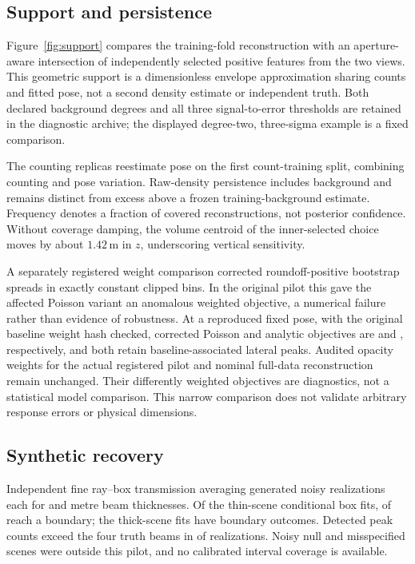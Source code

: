 \subsection{Support and persistence}
Figure~\ref{fig:support} compares the training-fold reconstruction with an aperture-aware intersection of independently selected positive features from the two views. This geometric support is a dimensionless envelope approximation sharing counts and fitted pose, not a second density estimate or independent truth. Both declared background degrees and all three signal-to-error thresholds are retained in the diagnostic archive; the displayed degree-two, three-sigma example is a fixed comparison.

The \InternalCountReplicas{} counting replicas reestimate pose on the first count-training split, combining counting and pose variation. Raw-density persistence includes background and remains distinct from excess above a frozen training-background estimate. Frequency denotes a fraction of covered reconstructions, not posterior confidence. Without coverage damping, the volume centroid of the inner-selected choice moves by about $1.42\,\mathrm{m}$ in $z$, underscoring vertical sensitivity.

A separately registered weight comparison corrected roundoff-positive bootstrap spreads in exactly constant clipped bins. In the original pilot this gave the affected Poisson variant an anomalous weighted objective, a numerical failure rather than evidence of robustness. At a reproduced fixed pose, with the original baseline weight hash checked, corrected Poisson and analytic objectives are \InternalCorrectedPoissonObjective{} and \InternalCorrectedAnalyticObjective{}, respectively, and both retain \InternalCorrectedWeightPeaks{} baseline-associated lateral peaks. Audited opacity weights for the actual registered pilot and nominal full-data reconstruction remain unchanged. Their differently weighted objectives are diagnostics, not a statistical model comparison. This narrow comparison does not validate arbitrary response errors or physical dimensions.

\subsection{Synthetic recovery}
Independent fine ray--box transmission averaging generated \InternalThinReplicas{} noisy realizations each for \InternalThinTruthThickness{} and \InternalThickTruthThickness{} metre beam thicknesses. Of the thin-scene conditional box fits, \InternalThinBoundary{} of \InternalThinReplicas{} reach a boundary; the thick-scene fits have \InternalThickBoundary{} boundary outcomes. Detected peak counts exceed the four truth beams in \InternalExcessPeakOutcomes{} of \InternalRecoveryOutcomes{} realizations. Noisy null and misspecified scenes were outside this pilot, and no calibrated interval coverage is available.

